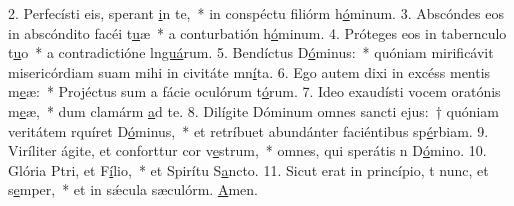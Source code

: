 2. Perfecísti eis,  sperant \uline{i}n te,~* in conspéctu filiórm h\uline{ó}minum.
3. Abscóndes eos in abscóndito facéi t\uline{u}æ~* a conturbatión h\uline{ó}minum.
4. Próteges eos in tabernculo t\uline{u}o~* a contradictióne ln\uline{guá}rum.
5. Bendíctus D\uline{ó}minus:~* quóniam mirificávit misericórdiam suam mihi in civitáte mn\uline{í}ta.
6. Ego autem dixi in excéss mentis m\uline{e}æ:~* Projéctus sum a fácie oculórum t\uline{ó}rum.
7. Ideo exaudísti vocem oratónis m\uline{e}æ,~* dum clamárm \uline{a}d te.
8. Dilígite Dóminum omnes sancti ejus:~† quóniam veritátem rquíret D\uline{ó}minus,~* et retríbuet abundánter faciéntibus sp\uline{é}rbiam.
9. Viríliter ágite, et conforttur cor v\uline{e}strum,~* omnes, qui sperátis n D\uline{ó}mino.
10. Glória Ptri, et F\uline{í}lio,~* et Spirítu S\uline{a}ncto.
11. Sicut erat in princípio, t nunc, et s\uline{e}mper,~* et in sǽcula sæculórm. \uline{A}men.
